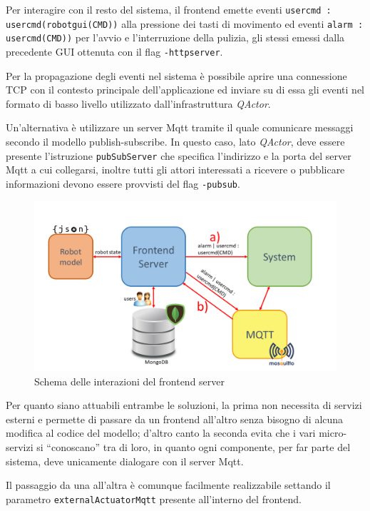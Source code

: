 \documentclass{../llncs}
\newcommand{\codescript}[1]{{\mbox{\small{\texttt{#1}}}}\xspace}
\newcommand{\qa}{\textsf{\textit{QActor}}\xspace}
\newcommand{\labelfig}[1]{\label{fig:#1}}
\begin{document}
Per interagire con il resto del sistema, il frontend emette eventi \codescript{usercmd : usercmd(robotgui(CMD))} alla pressione dei tasti di movimento ed eventi \codescript{alarm : usercmd(CMD))} per l'avvio e l'interruzione della pulizia, gli stessi emessi dalla precedente GUI ottenuta con il flag \codescript{-httpserver}.

Per la propagazione degli eventi nel sistema è possibile aprire una connessione TCP con il contesto principale dell'applicazione ed inviare su di essa gli eventi nel formato di basso livello utilizzato dall'infrastruttura \qa.

Un'alternativa è utilizzare un server Mqtt tramite il quale comunicare messaggi secondo il modello publish-subscribe. In questo caso, lato \qa, deve essere presente l'istruzione \codescript{pubSubServer} che specifica l'indirizzo e la porta del server Mqtt a cui collegarsi, inoltre tutti gli attori interessati a ricevere o pubblicare informazioni devono essere provvisti del flag \codescript{-pubsub}.

\begin{figure}
\centering
\includegraphics[scale=0.40]{img/frontendServer.png}
\caption{Schema delle interazioni del frontend server}\labelfig{frontendServer}
\end{figure}

Per quanto siano attuabili entrambe le soluzioni, la prima non necessita di servizi esterni e permette di passare da un frontend all'altro senza bisogno di alcuna modifica al codice del modello; d'altro canto la seconda evita che i vari micro-servizi si ``conoscano'' tra di loro, in quanto ogni componente, per far parte del sistema, deve unicamente dialogare con il server Mqtt.

Il passaggio da una all'altra è comunque facilmente realizzabile settando il parametro \codescript{externalActuatorMqtt} presente all'interno del frontend.\\
\end{document}
